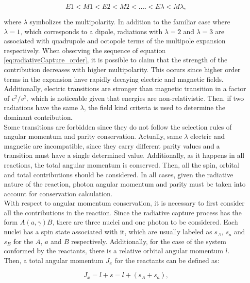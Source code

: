 \documentclass[openany]{book}
\begin{document}
\begin{equation}  \label{eq:radiativeCapture_order}
	E1 < M1 < E2 < M2 < .... < E\lambda < M\lambda,
\end{equation}

where $\lambda$ symbolizes the multipolarity. In addition to the familiar case where $\lambda = 1$, which corresponds to a dipole, radiations with $\lambda = 2$ and $\lambda = 3$ are associated with quadrupole and octopole terms of the multipole expansion respectively. When observing the sequence of equation \ref{eq:radiativeCapture_order}, it is possible to claim that the strength of the contribution decreases with higher multipolarity. This occurs since higher order terms in the expansion have rapidly decaying electric and magnetic fields. Additionally, electric transitions are stronger than magnetic transition in a factor of $c^2/v^2$, which is noticeable given that energies are non-relativistic. Then, if two radiations have the same $\lambda$, the field kind criteria is used to determine the dominant contribution. \\

Some transitions are forbidden since they do not follow the selection rules of angular momentum and parity conservation. Actually, same $\lambda$ electric and magnetic are incompatible, since they carry different parity values and a transition must have a single determined value. Additionally, as it happens in all reactions, the total angular momentum is conserved. Then, all the spin, orbital and total  contributions should be considered. In all cases, given the radiative nature of the reaction, photon angular momentum and parity must be taken into account for conservation calculation. \\

With respect to angular momentum conservation, it is necessary to first consider all the contributions in the reaction. Since the radiative capture process has the form $A(a, \gamma)B$, there are three nuclei and one photon to be considered. Each nuclei has a spin state associated with it, which are usually labeled as $s_A$, $s_a$ and $s_B$ for the $A$, $a$ and $B$ respectively. Additionally, for the case of the system conformed by the reactants, there is a relative orbital angular momentum $l$. Then, a total angular momentum $J_x$ for the reactants can be defined as: 

\begin{equation}  \label{eq:radiativeCapture_angularMomentum_reactants}
	J_x = l + s = l + (s_A + s_a),
\end{equation}
\end{document}

